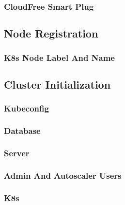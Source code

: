 \subsubsection{CloudFree Smart Plug}
\label{subsubsec:implementation_installer_node_power_consumption_cloudfree_smart_plug}

\subsection{Node Registration}
\label{subsec:implementation_installer_node_registration}

\subsubsection{K8s Node Label And Name}
\label{subsubsec:implementation_installer_node_registration_k8s_node_label_and_name}

\subsection{Cluster Initialization}
\label{subsec:implementation_installer_cluster_initialization}

\subsubsection{Kubeconfig}
\label{subsubsec:implementation_installer_cluster_initialization_kubeconfig}

\subsubsection{Database}
\label{subsubsec:implementation_installer_cluster_initialization_database}

\subsubsection{Server}
\label{subsubsec:implementation_installer_cluster_initialization_server}

\subsubsection{Admin And Autoscaler Users}
\label{subsubsec:implementation_installer_cluster_initialization_admin_and_autoscaler_users}

\subsubsection{K8s}
\label{subsubsec:implementation_installer_cluster_initialization_k8s}

